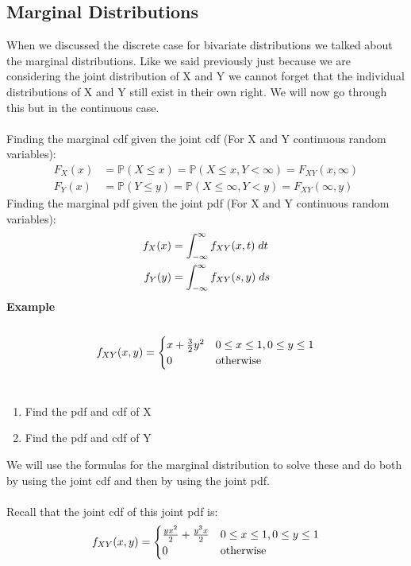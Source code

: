\documentclass[,oneside]{article}
\begin{document}
\begin{enumerate}
\subsection{Marginal Distributions}
When we discussed the discrete case for bivariate distributions we talked about the marginal distributions. Like we said previously just because we are considering the joint distribution of X and Y we cannot forget that the individual distributions of X and Y still exist in their own right. We will now go through this but in the continuous case.\\ \\ 
Finding the marginal cdf given the joint cdf (For X and Y continuous random variables):
\begin{align*}
F_X(x) &= \mathbb{P}(X \leq x)=\mathbb{P}(X\leq x,Y < \infty)=F_{XY}(x, \infty)\\
F_Y(x) &= \mathbb{P}(Y \leq y)=\mathbb{P}(X\leq \infty,Y < y)=F_{XY}(\infty ,y)
\end{align*}
Finding the marginal pdf given the joint pdf (For X and Y continuous random variables):
\begin{align*}
f_{X}(x)&=\int_{-\infty}^{\infty} f_{XY}(x,t)\hspace{0.1cm} dt\\
f_Y(y)&=\int_{-\infty}^{\infty} f_{XY}(s,y)\hspace{0.1cm} ds
\end{align*}
\textbf{Example}\\ \\
\[
f_{XY}(x,y)=
\begin{cases}
x+\frac{3}{2}y^2 &  0 \leq x \leq 1, 0 \leq y \leq 1\\
0 & $otherwise$
\end{cases} \] \\
\begin{enumerate}
\item Find the pdf and cdf of X
\item Find the pdf and cdf of Y
\end{enumerate}
We will use the formulas for the marginal distribution to solve these and do both by using the joint cdf and then by using the joint pdf.\\ \\
Recall that the joint cdf of this joint pdf is:
\[
f_{XY}(x,y)=
\begin{cases}
\frac{yx^2}{2} +\frac{y^3 x}{2} &  0 \leq x \leq 1, 0 \leq y \leq 1\\
0 & $otherwise$
\end{cases} \] \\

\end{enumerate}
\end{document}
